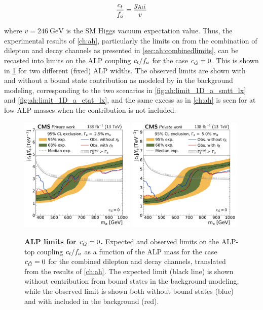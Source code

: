 \begin{equation}
    \frac{c_t}{f_a} = \frac{g_{\mathrm{A t \bar{t}}}}{v}
\end{equation}

\noindent where $v=\SI{246}{\GeV}$ is the SM Higgs vacuum expectation value. Thus, the experimental results of \cref{ch:ah}, particularly the limits on \gAtt from the combination of dilepton and \ljets decay channels as presented in \cref{sec:ah:combinedlimits}, can be recasted into limits on the ALP coupling $c_t/f_a$ for the case $c_{\tilde{G}} = 0$. This is shown in \cref{fig:alps:translation} for two different (fixed) ALP widths.
The observed limits are shown with and without a \ttbar bound state contribution as modeled by \etat in the background modeling, corresponding to the two scenarios in \cref{fig:ah:limit_1D_a_smtt_lx} and \cref{fig:ah:limit_1D_a_etat_lx}, and the same excess as in \cref{ch:ah} is seen for at low ALP masses when the \etat contribution is not included.

\begin{figure}[t]
    \centering
    \includegraphics[width=0.49\textwidth]{figures/alps/A_limit_w2p5_g-scan_alp_lx.pdf}
    \hfill
    \includegraphics[width=0.49\textwidth]{figures/alps/A_limit_w5p0_g-scan_alp_lx.pdf}
    \caption{
        \textbf{ALP limits for $c_{\tilde{G}} = 0$.} Expected and observed limits on the ALP-top coupling $c_t / f_a$ as a function of the ALP mass for the case $c_{\tilde{G}} = 0$ for the combined dilepton and \ljets decay channels, translated from the results of \cref{ch:ah}. The expected limit (black line) is shown without contribution from \ttbar bound states in the background modeling, while the observed limit is shown both without \ttbar bound states (blue) and with \etat included in the background (red).
    }
    \label{fig:alps:translation}
\end{figure}

